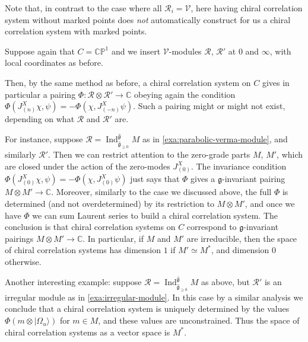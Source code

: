 \documentclass[12pt,letterpaper,reqno]{amsart}
\numberwithin{equation}{section}
\newcommand{\fg}{{\mathfrak g}}
\newcommand{\hfg}{{\widehat\fg}}
\newcommand{\bbC}{\ensuremath{\mathbb C}}
\newcommand{\bbP}{\ensuremath{\mathbb P}}
\newcommand\vacu{{|\Omega_u\rangle}}
\newcommand{\vertex}{\mathcal{V}}
\newcommand{\vrep}{\mathcal{R}}
\newcommand{\ti}[1]{\textit{#1}}
\DeclareMathOperator{\Ind}{Ind}
\begin{document}
Note that, in contrast to the case where all $\vrep_i = \vertex$, 
here having chiral correlation
system without marked points does \ti{not} 
automatically construct for us
a chiral correlation system with marked points.

\begin{example}
Suppose again that $C = \bbC \bbP^1$ and we insert $\vertex$-modules $\vrep$, $\vrep'$ at $0$ and $\infty$, with local 
coordinates as before.

Then, by the same method as before, 
a chiral correlation system on $C$ gives in particular 
a pairing $\Phi: \vrep \otimes \vrep' \to \bbC$
obeying again the condition
$\Phi(J^X_{(n)} \chi, \psi) = - \Phi(\chi, J^X_{(-n)} \psi)$.
Such a pairing might or might not exist, depending on
what $\vrep$ and $\vrep'$ are.

For instance, suppose $\vrep = \Ind^{\hfg}_{\hfg_{\ge 0}} M$ as in 
\autoref{exa:parabolic-verma-module}, and similarly $\vrep'$.
Then we can restrict attention to the zero-grade parts 
$M$, $M'$, which are closed under the action of the zero-modes $J^X_{(0)}$.
The invariance condition 
$\Phi(J^X_{(0)} \chi, \psi) = - \Phi(\chi, J^X_{(0)} \psi)$
just says that $\Phi$ gives a $\fg$-invariant pairing $M \otimes M' \to \bbC$.
Moreover, similarly to the case we discussed above, the full $\Phi$ is determined (and not overdetermined)
by its restriction to $M \otimes M'$, and once we have $\Phi$ we can sum Laurent series to build
a chiral correlation system.
The conclusion is that chiral correlation systems on $C$ correspond to $\fg$-invariant pairings $M \otimes M' \to \bbC$.
In particular, if $M$ and $M'$ are irreducible, then the space of chiral correlation systems has dimension $1$ if
$M' \simeq M^*$, and dimension $0$ otherwise.

Another interesting example: suppose $\vrep = \Ind^{\hfg}_{\hfg_{\ge 0}} M$ as above, but
$\vrep'$ is an irregular module as in \autoref{exa:irregular-module}. In this case by a similar analysis
we conclude that a chiral correlation system is uniquely determined by the values $\Phi(m \otimes \vacu)$ for $m \in M$,
and these values are unconstrained. Thus the space of chiral correlation systems as a vector space is $M^*$. 
\end{example}
\end{document}
